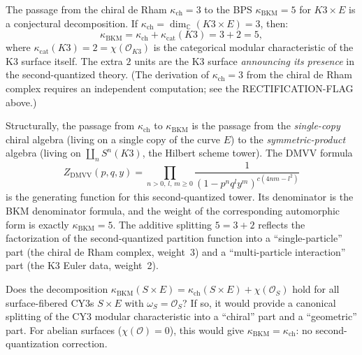 \documentclass[11pt]{article}
\newcommand{\cO}{\mathcal{O}}
\newcommand{\C}{\mathbb{C}}
\begin{document}
The passage from the chiral de Rham $\kappa_{\mathrm{ch}} = 3$ to the BPS $\kappa_{\mathrm{BKM}} = 5$ for $K3 \times E$ is a conjectural decomposition. If $\kappa_{\mathrm{ch}} = \dim_\C(K3 \times E) = 3$, then:
\[
 \kappa_{\mathrm{BKM}} = \kappa_{\mathrm{ch}} + \kappa_{\mathrm{cat}}(K3) = 3 + 2 = 5,
\]
where $\kappa_{\mathrm{cat}}(K3) = 2 = \chi(\cO_{K3})$ is the categorical modular characteristic of the K3 surface itself. The extra $2$ units are the K3 surface \emph{announcing its presence} in the second-quantized theory. (The derivation of $\kappa_{\mathrm{ch}} = 3$ from the chiral de Rham complex requires an independent computation; see the RECTIFICATION-FLAG above.)

Structurally, the passage from $\kappa_{\mathrm{ch}}$ to $\kappa_{\mathrm{BKM}}$ is the passage from the \emph{single-copy} chiral algebra (living on a single copy of the curve $E$) to the \emph{symmetric-product} algebra (living on $\coprod_n S^n(K3)$, the Hilbert scheme tower). The DMVV formula
\[
 Z_{\mathrm{DMVV}}(p, q, y)
 = \prod_{n > 0,\, l,\, m \geq 0}
 \frac{1}{(1 - p^n q^l y^m)^{c(4nm - l^2)}}
\]
is the generating function for this second-quantized tower. Its denominator is the BKM denominator formula, and the weight of the corresponding automorphic form is exactly $\kappa_{\mathrm{BKM}} = 5$. The additive splitting $5 = 3 + 2$ reflects the factorization of the second-quantized partition function into a ``single-particle'' part (the chiral de Rham complex, weight~3) and a ``multi-particle interaction'' part (the K3 Euler data, weight~2).


\begin{question}
Does the decomposition $\kappa_{\mathrm{BKM}}(S \times E) = \kappa_{\mathrm{ch}}(S \times E) + \chi(\cO_S)$ hold for all surface-fibered CY3s $S \times E$ with $\omega_S = \cO_S$? If so, it would provide a canonical splitting of the CY3 modular characteristic into a ``chiral'' part and a ``geometric'' part. For abelian surfaces ($\chi(\cO) = 0$), this would give $\kappa_{\mathrm{BKM}} = \kappa_{\mathrm{ch}}$: no second-quantization correction.
\end{question}
\end{document}
